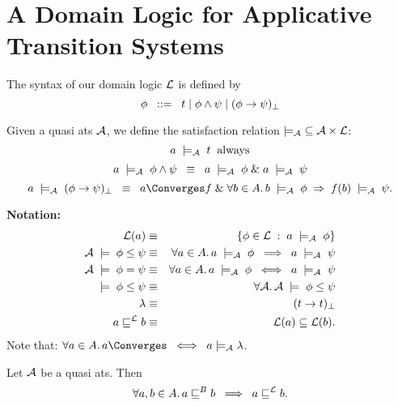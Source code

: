 \section{A Domain Logic for Applicative Transition Systems}
\begin{definition}
{\rm The syntax of our domain logic ${\cal L}$ is defined by}
\[ \phi \;\; ::= \;\; {\sl t} \; | \; \phi \wedge \psi \; | \; (\phi \rightarrow \psi)_{\bot} \]
\end{definition}
\begin{definition}
{\rm Given a quasi ats ${\cal A}$, we define the satisfaction relation ${\models_{{\cal A}}} \subseteq {{\cal A} \times {\cal L}}$:}
\[ a \; \models_{{\cal A}} \; {\sl t}  \;\; {\rm always} \]
\[ a \; \models_{{\cal A}} \; \phi \wedge \psi \; \; \equiv \;\;   a \; \models_{{\cal A}} \; \phi \; \& \;  a \; \models_{{\cal A}} \; \psi \]
\[ a \; \models_{{\cal A}} \; (\phi \rightarrow \psi )_{\bot} \;\; \equiv \;\; a \Converges f \; \& \; \forall b \in A . \, b \; \models_{{\cal A}} \; \phi \; \Rightarrow \; f(b) \; \models_{{\cal A}} \; \psi . \]
\end{definition}
{\bf Notation:}
\begin{eqnarray*}
{\cal L}(a) & \equiv &  \{ \phi \in {\cal L} \; : \; a \; \models_{{\cal A}} \; \phi \} \\
{\cal A} \; \models \; \phi \leq \psi  & \equiv & \forall a \in A . \, a \; \models_{{\cal A}} \; \phi \;\; \Longrightarrow \;\; a \; \models_{{\cal A}} \; \psi \\
{\cal A} \; \models \; \phi = \psi   & \equiv & \forall a \in A . \, a \; \models_{{\cal A}} \; \phi \;\; \Longleftrightarrow \;\; a \; \models_{{\cal A}} \; \psi \\
\models \; \phi \leq \psi  & \equiv & \forall {\cal A} . \, {\cal A} \; \models \; \phi \leq \psi \\
\lambda  & \equiv & ({\sl t} \rightarrow {\sl t})_{\bot} \\
a \sqsubseteq^{\cal L} b & \equiv & {\cal L}(a) \subseteq {\cal L}(b) .
\end{eqnarray*}
Note that: $\forall a \in A . \, a \Converges \;\; \Longleftrightarrow \;\; a \models_{{\cal A}} \lambda$.
\begin{lemma}
Let ${\cal A}$ be a quasi ats. Then
\[ \forall a, b \in A . \, a \sqsubseteq^{B} b \;\; \Longrightarrow \;\; a \sqsubseteq^{{\cal L}} b . \]
\end{lemma}

